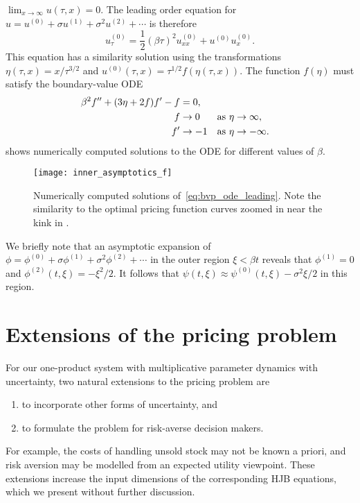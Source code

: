 \documentclass[main.tex]{subfiles}
\begin{document}
$\lim_{x\to \infty}u(\tau,x) = 0$.
The leading order equation for $u = u^{(0)}+\sigma u^{(1)}+\sigma^2 u^{(2)}+\cdots$ is therefore
\begin{equation}
  u^{(0)}_\tau = \frac{1}{2}{(\beta \tau)}^2u^{(0)}_{xx} + u^{(0)}u^{(0)}_x.
\end{equation}
This equation has a similarity solution using the transformations
$\eta(\tau,x)= x/\tau^{3/2}$ and $u^{(0)}(\tau,x) = \tau^{1/2}f(\eta(\tau,x))$.
The function $f(\eta)$ must satisfy the boundary-value ODE
\begin{align}\label{eq:bvp_ode_leading}
  \beta^2f^{\prime\prime} + (3\eta + 2f)f^\prime - f
  &= 0,\\
  f&\to 0 &\textnormal{as } \eta&\to \infty,\\
  f^\prime &\to -1&\textnormal{as } \eta&\to -\infty.
\end{align}
 shows numerically computed solutions to the
ODE for different values of $\beta$.
\begin{figure}[hbt]
  \centering
  \texttt{[image: inner\_asymptotics\_f]}
  \caption{Numerically computed solutions of~\eqref{eq:bvp_ode_leading}.
    Note the similarity to the optimal pricing function curves zoomed
    in near the kink in .
  }\label{fig:inner_leading_f}
\end{figure}

We briefly note that an asymptotic expansion of
$\phi=\phi^{(0)}+\sigma\phi^{(1)}+\sigma^2\phi^{(2)}+\cdots$
in the outer region $\xi<\beta t$ reveals that $\phi^{(1)}=0$ and
$\phi^{(2)}(t,\xi)=-\xi^2/2$. It follows that
$\psi(t,\xi)\approx \psi^{(0)}(t,\xi)-\sigma^2 \xi/2$ in this region.

\section{Extensions of the pricing problem}\label{sec:extensions}
For our one-product system with multiplicative parameter dynamics with uncertainty,
two natural extensions to the pricing problem are
\begin{enumerate}
\item to incorporate
  other forms of uncertainty, and
\item to formulate the problem for risk-averse
  decision makers.
\end{enumerate}
For example, the costs of handling unsold stock may
not be known a priori, and risk aversion may be modelled from an
expected utility viewpoint.
These extensions increase the input dimensions of the corresponding
HJB equations, which we present without further discussion.
\end{document}
